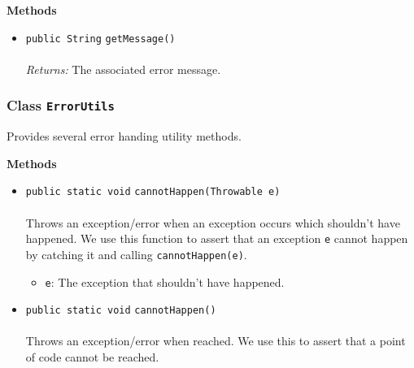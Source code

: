 \textbf{\sffamily Methods}
\begin{itemize}
\item \lstinline|public String| \lstinline|getMessage|\lstinline|()|\\ \\[-0.6em]
\emph{Returns:} The associated error message.



\end{itemize}

\subsubsection{Class \lstinline|ErrorUtils|}
Provides several error handing utility methods. \\
\noindent\begin{minipage}[t]{5cm}
\vspace{0.3em}
\hspace*{2em}
\vspace{0.3em}
\end{minipage}





\textbf{\sffamily Methods}
\begin{itemize}
\item \lstinline|public static void| \lstinline|cannotHappen|\lstinline|(Throwable e)|\\ \\[-0.6em]
Throws an exception/error when an exception occurs which shouldn't have happened.
 We use this function to assert that an exception \lstinline|e| cannot happen by
 catching it and calling \lstinline|cannotHappen(e)|.
\begin{itemize}
\item \lstinline|e|: The exception that shouldn't have happened.
\end{itemize}



\item \lstinline|public static void| \lstinline|cannotHappen|\lstinline|()|\\ \\[-0.6em]
Throws an exception/error when reached. We use this to assert that
 a point of code cannot be reached.



\end{itemize}

